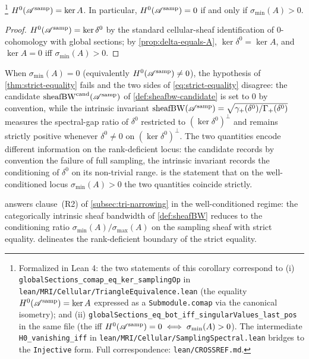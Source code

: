 \begin{corollary}\label{cor:H0-vanishing}\footnote{Formalized in Lean 4: the two statements of this corollary correspond to (i) \texttt{globalSections\_comap\_eq\_ker\_samplingOp} in \texttt{lean/MRI/Cellular/TriangleEquivalence.lean} (the equality $H^0(\mathscr{A}^{\mathrm{samp}}) = \ker A$ expressed as a \texttt{Submodule.comap} via the canonical isometry); and (ii) \texttt{globalSections\_eq\_bot\_iff\_singularValues\_last\_pos} in the same file (the iff $H^0(\mathscr{A}^{\mathrm{samp}}) = 0 \iff \sigma_{\min}(A) > 0$). The intermediate \texttt{H0\_vanishing\_iff} in \texttt{lean/MRI/Cellular/SamplingSpectral.lean} bridges to the \texttt{Injective} form. Full correspondence: \texttt{lean/CROSSREF.md}.}
$H^0(\mathscr{A}^{\mathrm{samp}}) = \ker A$. In particular, $H^0(\mathscr{A}^{\mathrm{samp}}) = 0$ if and
only if $\sigma_{\min}(A) > 0$.
\end{corollary}

\begin{proof}
$H^0(\mathscr{A}^{\mathrm{samp}}) = \ker \delta^0$ by the standard cellular-sheaf
identification of $0$-cohomology with global sections; by
\cref{prop:delta-equals-A}, $\ker \delta^0 = \ker A$, and
$\ker A = 0$ iff $\sigma_{\min}(A) > 0$.
\end{proof}

\begin{remark}\label{rem:rank-deficient-locus}
When $\sigma_{\min}(A) = 0$ (equivalently $H^0(\mathscr{A}^{\mathrm{samp}}) \ne 0$), the
hypothesis of \cref{thm:strict-equality} fails and the two sides of
\cref{eq:strict-equality} disagree: the candidate
$\operatorname{sheafBW}^{\mathrm{cand}}(\mathscr{A}^{\mathrm{samp}})$ of
\cref{def:sheafbw-candidate} is set to $0$ by convention, while the
intrinsic invariant $\operatorname{sheafBW}(\mathscr{A}^{\mathrm{samp}}) = \sqrt{\gamma_+(\delta^0) /
\Gamma_+(\delta^0)}$ measures the spectral-gap ratio of $\delta^0$
restricted to $(\ker \delta^0)^\perp$ and remains strictly positive
whenever $\delta^0 \ne 0$ on $(\ker \delta^0)^\perp$. The two
quantities encode different information on the rank-deficient locus:
the candidate records by convention the failure of full sampling,
the intrinsic invariant records the conditioning of $\delta^0$ on
its non-trivial range.  is the statement
that on the well-conditioned locus $\sigma_{\min}(A) > 0$ the two
quantities coincide strictly.
\end{remark}

 answers clause~\textup{(R2)} of
\cref{subsec:tri-narrowing} in the well-conditioned regime: the
categorically intrinsic sheaf bandwidth of \cref{def:sheafBW}
reduces to the conditioning ratio
$\sigma_{\min}(A)/\sigma_{\max}(A)$ on the sampling sheaf with
strict equality.  delineates the
rank-deficient boundary of the strict equality.

